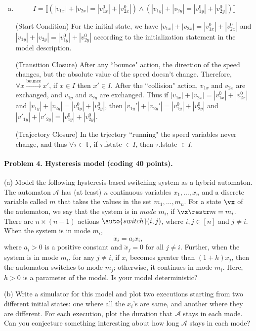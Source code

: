 \documentclass[11pt]{article}
\newcommand{\A}[0]{\mathcal{A}}
\begin{document}
\begin{enumerate}[(a)]
\item
$$I = \llbracket (|v_{1x}|+|v_{2x}| = |v_{1x}^0|+|v_{2x}^0|) \wedge (|v_{1y}|+|v_{2y}| = |v_{1y}^0|+|v_{2y}^0|) \rrbracket$$

\noindent (Start Condition) For the initial state, we have $|v_{1x}|+|v_{2x}| = |v_{1x}^0|+|v_{2x}^0|$ and $|v_{1y}|+|v_{2y}| = |v_{1y}^0|+|v_{2y}^0|$ according to the initialization statement in the model description.

\noindent (Transition Closure) After any ``bounce" action, the direction of the speed changes, but the absolute value of the speed doesn't change. Therefore, $\forall x \xrightarrow{\text{bounce}} x'$, if $x \in I$ then $x' \in I$. After the ``collision" action, $v_{1x}$ and $v_{2x}$ are exchanged, and $v_{1y}$ and $v_{2y}$ are exchanged. Thus if $|v_{1x}|+|v_{2x}| = |v_{1x}^0|+|v_{2x}^0|$ and $|v_{1y}|+|v_{2y}| = |v_{1y}^0|+|v_{2y}^0|$, then $|v_{1y}'|+|v_{2y}'| = |v_{1y}^0|+|v_{2y}^0|$ and $|v'_{1y}|+|v'_{2y}| = |v_{1y}^0|+|v_{2y}^0|$.

\noindent (Trajectory Closure) In the trjectory ``running" the speed variables never change, and thus $\forall \tau \in \mathbb{T}$, if $\tau$.fstate $\in I$, then $\tau$.lstate $\in I$.
\end{enumerate}

\paragraph{Problem 4. Hysteresis model (coding 40 points).}
(a) Model the following hysteresis-based switching system as a hybrid automaton. The automaton $\A$ has (at least) $n$ continuous variables $x_1,\ldots,x_n$ and a discrete variable called $m$ that takes the values in the set $m_1,\ldots, m_n$. For a state $\vx$ of the automaton, we say that the system is in $\mathit{mode}$ $m_i$, if $\vx \restr m =  m_i$. There are $n \times (n-1)$ actions $\auto{switch}(i,j)$, where $i, j \in [n]$ and $j\neq i$. When the system is in mode $m_i$,
\[
 \dot{x}_i=a_i x_i,
\]
where $a_i>0$ is a positive constant and $\dot{x}_j =0$ for all $j \neq i$. Further, when the system is in mode $m_i$, for any $j \neq  i$, if $x_i$ becomes greater than $(1+h)x_j$, then the automaton switches to mode $m_j$; otherwise, it continues in mode $m_i$. Here, $h > 0$ is a parameter of the model. Is your model deterministic?

(b) Write a simulator for this model and plot two executions starting from two different initial states: one where all the $x_i$'s are same, and another where they are different. For each execution, plot the duration that $\A$ stays in each mode. Can you conjecture something interesting about how long $\A$ stays in each mode?
\end{document}
